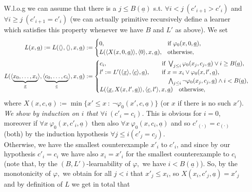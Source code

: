 \documentclass[1p]{elsarticle}
\newcommand{\tup}{\underline} %
\newcommand{\Tif}{\text{if}\ }
\newcommand{\Telse}{\text{otherwise}}
\theoremstyle{plain}
\theoremstyle{definition}
\theoremstyle{remark}
\renewenvironment{proof}[1][]{\noindent{\bf Proof{#1}. }}{\nopagebreak[4]{\hspace*{\fill}
  $\Box$              %
 }{\vspace{2ex}}}
\renewcommand{\phi}{\varphi}
\theoremstyle{definition}
\begin{document}
\begin{proof}
W.l.o.g we can assume that there is a $j\leq B(\tup a)$ s.t. $\forall i<j\ 
(c'_{i+1}>c'_i)$ and $\forall i\geq j\ (c'_{i+1}=c'_i)$ (we can actually primitive recursively define a learner which satisfies this property whenever we have $B$ and $L'$ as above). We set
\begin{align*}
L(x, \tup a):=L(\langle\rangle,\langle\rangle,x, \tup a)&:=\begin{cases}
0,&\Tif \phi_0(x,0,\tup a),\\
L( \langle X(x,0,\tup a)\rangle,\langle0\rangle,x,\tup a),&\Telse,\end{cases}\\ L(\langle \underbrace{x_0,\ldots,x_i}_{\tup x}\rangle, \langle \underbrace{c_0,\ldots,c_i}_{\tup c}\rangle,x,\tup a)&:=\begin{cases}
c_i,& \hspace*{-10mm}\Tif \bigvee_{j\leq i}\phi_0(x_j,c_j,\tup a)\vee i\ge B(\underline{a}),\\
l':=L'(\langle {\tup x}\rangle, \langle {\tup c}\rangle,\tup a),&
\hspace*{-10mm}\Tif x=x_i\vee \phi_0(x,l',\tup a),\\
&\hspace*{-10mm}\phantom{\Tif} \bigwedge_{j\leq i}\neg\phi_0(x_j,c_j,\tup a)\wedge i< 
B(\underline{a}),\\
L( \langle {\tup x},X(x,l',\tup a)\rangle,
\langle \tup c,l'\rangle,x,\tup a) &\Telse,
\end{cases}\\
\end{align*}
where $X(x,c,\tup a):=\min\{x'\leq x\ :\ \neg \phi_0(x',c,\tup a)\}$ (or $x$ if there is no such $x'$). \\
{\em We show by induction on $i$ that $\forall i\ (c'_i = c_i)$.} This is obvious for $i=0$, moreover 
if $\forall x\ \phi_0(x,c'_{i},\tup a)$ then also $\forall x\ \phi_0(x,c_{i},\tup a)$ and so $c'_{(\cdot)}=c_{(\cdot)}$ (both) by the induction hypothesis 
$\forall j\le i (c'_j=c_j).$\\ Otherwise, we have the smallest counterexample $x'_i$ to $c'_i$, and since by our hypothesis $c'_i=c_i$ we have also $x_i=x'_i$ for the smallest counterexample to $c_i$ (note that, by the 
$(B,L')$-learnability of $\varphi,$ we have $i<B(\underline{a})$). 
So, by the monotonicity of $\phi,$ we obtain for all $j<i$ that $x'_j\leq x_i$, so $X(x_i,c'_j,\tup a)=x'_j$ and by definition of $L$ we get in total that 
\begin{align*}

\end{align*}
\end{proof}
\end{document}
